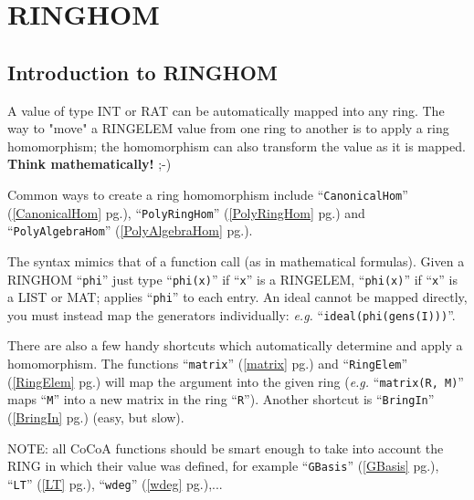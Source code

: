 \documentclass[a4paper]{mybook}
\begin{document}
\noindent



\chapter{RINGHOM}
\label{RINGHOM}

      

\section{Introduction to RINGHOM}
\label{Introduction to RINGHOM}

        
A value of type INT or RAT can be automatically mapped into
any ring.  The way to "move" a RINGELEM value from one ring to
another is to apply a ring homomorphism; the homomorphism can also
transform the value as it is mapped.  \textbf{Think mathematically!} ;-)
\par 
Common ways to create a ring homomorphism include ``\verb&CanonicalHom&'' (\ref{CanonicalHom} pg.\pageref{CanonicalHom}),
``\verb&PolyRingHom&'' (\ref{PolyRingHom} pg.\pageref{PolyRingHom}) and ``\verb&PolyAlgebraHom&'' (\ref{PolyAlgebraHom} pg.\pageref{PolyAlgebraHom}).
\par 
The syntax mimics that of a function call (as in mathematical formulas).
Given a RINGHOM ``\verb&phi&'' just type
  ``\verb&phi(x)&''        if ``\verb&x&'' is a RINGELEM,
  ``\verb&phi(x)&''        if ``\verb&x&'' is a LIST or MAT; applies ``\verb&phi&'' to each entry.
An ideal cannot be mapped directly, you must instead map the generators
individually: \textit{e.g.} ``\verb&ideal(phi(gens(I)))&''.
\par 
There are also a few handy shortcuts which automatically determine and
apply a homomorphism.  The functions ``\verb&matrix&'' (\ref{matrix} pg.\pageref{matrix}) and ``\verb&RingElem&'' (\ref{RingElem} pg.\pageref{RingElem}) will map
the argument into the given ring (\textit{e.g.} ``\verb&matrix(R, M)&'' maps ``\verb&M&'' into a
new matrix in the ring ``\verb&R&'').  Another shortcut is ``\verb&BringIn&'' (\ref{BringIn} pg.\pageref{BringIn}) (easy, but slow).
\par 
NOTE: all CoCoA functions should be smart enough to take into account
the RING in which their value was defined, for example
``\verb&GBasis&'' (\ref{GBasis} pg.\pageref{GBasis}), ``\verb&LT&'' (\ref{LT} pg.\pageref{LT}), ``\verb&wdeg&'' (\ref{wdeg} pg.\pageref{wdeg}),...
\end{document}
